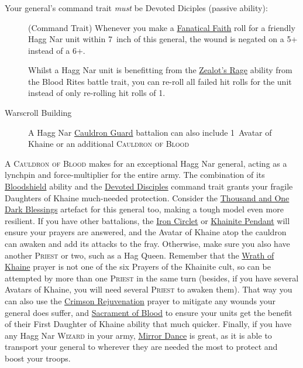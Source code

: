 \subsubsection{}
Your general's command trait \emph{must} be Devoted Diciples (passive ability):
\begin{description} 
    \item [] (Command Trait)
        Whenever you make a \hyperref[fanatical-faith]{Fanatical Faith} roll
        for a friendly Hagg Nar unit within 7~inch of this general, the
        wound is negated on a 5+ instead of a 6+.  
    \item [] Whilst a Hagg
        Nar unit is benefitting from the \hyperref[zealots-rage]{Zealot's Rage}
        ability from the Blood Rites battle trait, you can re-roll all failed
        hit rolls for the unit instead of only re-rolling hit rolls of 1.
    \item [Warscroll Building] A Hagg Nar \hyperref[cauldron-guard]{Cauldron
        Guard} battalion can also include 1~Avatar of Khaine or an additional
        \textsc{Cauldron of Blood}
\end{description}
A \textsc{Cauldron of Blood} makes for an exceptional Hagg Nar general, acting
as a lynchpin and force-multiplier for the entire army. The combination of its
\hyperref[bloodshield]{Bloodshield} ability and the
\hyperref[devoted-disciples]{Devoted Disciples} command trait grants your
fragile Daughters of Khaine much-needed protection. Consider the
\hyperref[thousand-and-one-dark-blessings]{Thousand and One Dark Blessings}
artefact for this general too, making a tough model even more resilient. If you
have other battalions, the \hyperref[iron-circlet]{Iron Circlet} or
\hyperref[khainite-pendant]{Khainite Pendant} will ensure your prayers are
answered, and the Avatar of Khaine atop the cauldron can awaken and add its
attacks to the fray. Otherwise, make sure you also have another \textsc{Priest}
or two, such as a Hag Queen. Remember that the \hyperref[wrath-of-khaine]{Wrath
of Khaine} prayer is not one of the six Prayers of the Khainite cult, so can be
attempted by more than one \textsc{Priest} in the same turn (besides, if you
have several Avatars of Khaine, you will need several \textsc{Priest} to awaken
them). That way you can also use the \hyperref[crimson-rejuvenation]{Crimson
Rejuvenation} prayer to mitigate any wounds your general does suffer, and
\hyperref[sacrament-of-blood]{Sacrament of Blood} to ensure your units get the
benefit of their First Daughter of Khaine ability that much quicker. Finally,
if you have any Hagg Nar \textsc{Wizard} in your army,
\hyperref[mirror-dance]{Mirror Dance} is great, as it is able to transport your
general to wherever they are needed the most to protect and boost your troops.
\\


